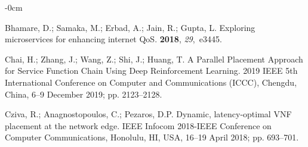 \documentclass[futureinternet,review,accept,pdftex,moreauthors]{Definitions/mdpi}
\begin{document}
\begin{adjustwidth}{-\extralength}{0cm}
\begin{thebibliography}{999}
Bhamare, D.; Samaka, M.; Erbad, A.; Jain, R.; Gupta, L.
\newblock Exploring microservices for enhancing internet QoS.
 {\bf
  2018}, {\em 29},~e3445.

Chai, H.; Zhang, J.; Wang, Z.; Shi, J.; Huang, T.
\newblock A Parallel Placement Approach for Service Function Chain Using Deep
  Reinforcement Learning.
 2019 IEEE 5th International Conference on Computer and
  Communications (ICCC),  Chengdu, China, 6--9 December 2019; pp. 2123--2128.

Cziva, R.; Anagnostopoulos, C.; Pezaros, D.P.
\newblock Dynamic, latency-optimal VNF placement at the network edge.
 IEEE Infocom 2018-IEEE Conference on Computer Communications, Honolulu, HI, USA, 16--19 April 2018; pp. 693--701.


\end{thebibliography}








%


\end{adjustwidth}
\end{document}
